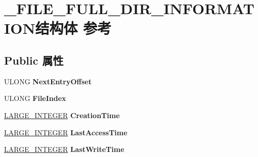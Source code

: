 \hypertarget{struct___f_i_l_e___f_u_l_l___d_i_r___i_n_f_o_r_m_a_t_i_o_n}{}\section{\+\_\+\+F\+I\+L\+E\+\_\+\+F\+U\+L\+L\+\_\+\+D\+I\+R\+\_\+\+I\+N\+F\+O\+R\+M\+A\+T\+I\+O\+N结构体 参考}
\label{struct___f_i_l_e___f_u_l_l___d_i_r___i_n_f_o_r_m_a_t_i_o_n}
\subsection*{Public 属性}
\begin{DoxyCompactItemize}
\item 
\mbox{\label{struct___f_i_l_e___f_u_l_l___d_i_r___i_n_f_o_r_m_a_t_i_o_n_ad82ba566def364f458fc516669adad43}} 
U\+L\+O\+NG {\bfseries Next\+Entry\+Offset}
\item 
\mbox{\label{struct___f_i_l_e___f_u_l_l___d_i_r___i_n_f_o_r_m_a_t_i_o_n_a3b40f88c5ddba8fdfa04b313048e591d}} 
U\+L\+O\+NG {\bfseries File\+Index}
\item 
\mbox{\label{struct___f_i_l_e___f_u_l_l___d_i_r___i_n_f_o_r_m_a_t_i_o_n_a62ea40fc80f2f178a9295fcef8d24235}} 
\hyperlink{union___l_a_r_g_e___i_n_t_e_g_e_r}{L\+A\+R\+G\+E\+\_\+\+I\+N\+T\+E\+G\+ER} {\bfseries Creation\+Time}
\item 
\mbox{\label{struct___f_i_l_e___f_u_l_l___d_i_r___i_n_f_o_r_m_a_t_i_o_n_abeb1dc74183b0fbc5b84b43416b61df3}} 
\hyperlink{union___l_a_r_g_e___i_n_t_e_g_e_r}{L\+A\+R\+G\+E\+\_\+\+I\+N\+T\+E\+G\+ER} {\bfseries Last\+Access\+Time}
\item 
\mbox{\label{struct___f_i_l_e___f_u_l_l___d_i_r___i_n_f_o_r_m_a_t_i_o_n_acc74867cb9391543e828c2d7063388c5}} 
\hyperlink{union___l_a_r_g_e___i_n_t_e_g_e_r}{L\+A\+R\+G\+E\+\_\+\+I\+N\+T\+E\+G\+ER} {\bfseries Last\+Write\+Time}
\item 

\end{DoxyCompactItemize}
